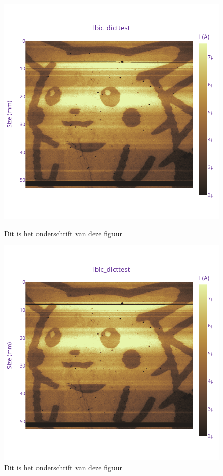 \begin{figure}
    \centering
    \begin{minipage}{0.45\textwidth}
        \includegraphics[width=\linewidth]{Figures/newplot(4).png}
        \caption{Dit is het onderschrift van deze figuur}
        \label{fig:p1}
    \end{minipage}
    \hspace{0.05\textwidth}
    \begin{minipage}{0.45\textwidth}
        \includegraphics[width=\linewidth]{Figures/newplot(4).png}
        \caption{Dit is het onderschrift van deze figuur}
        \label{fig:p2}
    \end{minipage}
\end{figure}

